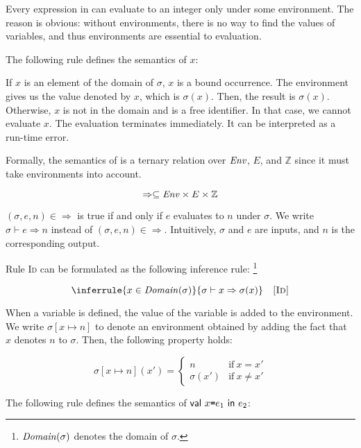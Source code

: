 Every expression in \Lang can evaluate to an integer only under some
environment. The reason is obvious: without environments, there is no way to
find the values of variables, and thus environments are essential to evaluation.

The following rule defines the semantics of $x$:


If $x$ is an element of the domain of $\sigma$, $x$ is a bound occurrence. The
environment gives us the value denoted by $x$, which is $\sigma(x)$. Then, the
result is $\sigma(x)$. Otherwise, $x$ is not in the domain and is a free
identifier. In that case, we cannot evaluate $x$. The evaluation terminates
immediately. It can be interpreted as a run-time error.

Formally, the semantics of \Lang is a
ternary relation over $\mbox{\emph{Env}}$, $E$, and $\mathbb{Z}$ since it must take
environments into account.

\[\Rightarrow\subseteq\mbox{\emph{Env}}\times E\times\mathbb{Z}\]

$(\sigma,e,n)\in\Rightarrow$ is true if and only if
$e$ evaluates to $n$ under $\sigma$.
We write $\sigma\vdash e\Rightarrow n$ instead of $(\sigma,e,n)\in\Rightarrow$.
Intuitively, $\sigma$ and $e$ are inputs, and $n$ is the corresponding output.

Rule \textsc{Id} can be formulated as the following inference rule:
\footnote{$\mbox{\emph{Domain}}(\sigma)$ denotes the domain of $\sigma$.}

\[
  \inferrule
  { x\in\dom{\sigma} }
  { \evald{x}{\sigma(x)} }
  \quad\textsc{[Id]}
\]

When a variable is defined, the value of the variable is added to the environment.
We write $\sigma[x\mapsto n]$ to denote an environment obtained by adding the
fact that $x$ denotes $n$ to $\sigma$. Then, the following property holds:

\[
\sigma [x\mapsto n](x') =
\begin{cases}
  n & \text{if}\ x=x' \\
  \sigma(x') & \text{if}\ x\neq x'
\end{cases}
\]

The following rule defines the semantics of $\textsf{val}\ x\texttt{=} e_1\ \textsf{in}\ e_2$:


